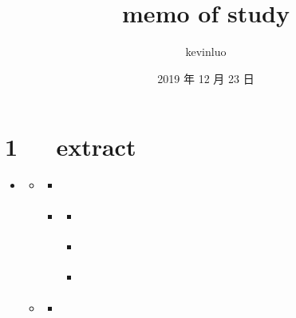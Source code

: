 \documentclass[letterpaper,12pt,english]{sphinxmanual}
\title{memo of study}
\date{2019 年 12 月 23 日}
\author{kevinluo}
\begin{document}
\pagestyle{empty}
\sphinxmaketitle
\pagestyle{plain}
\sphinxtableofcontents
\pagestyle{normal}
\label{\detokenize{index::doc}}



\chapter{1   extract}
\label{\detokenize{000misc/extract:extract}}\label{\detokenize{000misc/extract::doc}}
\begin{sphinxShadowBox}
\begin{itemize}
\item {} 
\label{\detokenize{000misc/extract:id8}}{\hyperref[\detokenize{000misc/extract:extract}]{}}
\begin{itemize}
\item {} 
\label{\detokenize{000misc/extract:id9}}{\hyperref[\detokenize{000misc/extract:id2}]{}}
\begin{itemize}
\item {} 
\label{\detokenize{000misc/extract:id10}}{\hyperref[\detokenize{000misc/extract:id3}]{}}

\item {} 
\label{\detokenize{000misc/extract:id11}}{\hyperref[\detokenize{000misc/extract:c4d-3dmax-maya}]{}}
\begin{itemize}
\item {} 
\label{\detokenize{000misc/extract:id12}}{\hyperref[\detokenize{000misc/extract:dmax-c4d}]{}}

\item {} 
\label{\detokenize{000misc/extract:id13}}{\hyperref[\detokenize{000misc/extract:dmaxmayac4d}]{}}

\item {} 
\label{\detokenize{000misc/extract:id14}}{\hyperref[\detokenize{000misc/extract:c4d-c4d}]{}}

\end{itemize}

\end{itemize}

\item {} 
\label{\detokenize{000misc/extract:id15}}{\hyperref[\detokenize{000misc/extract:id4}]{}}
\begin{itemize}
\item {} 
\label{\detokenize{000misc/extract:id16}}{\hyperref[\detokenize{000misc/extract:graphviz}]{}}


\end{itemize}
\end{itemize}
\end{itemize}
\end{sphinxShadowBox}
\end{document}
